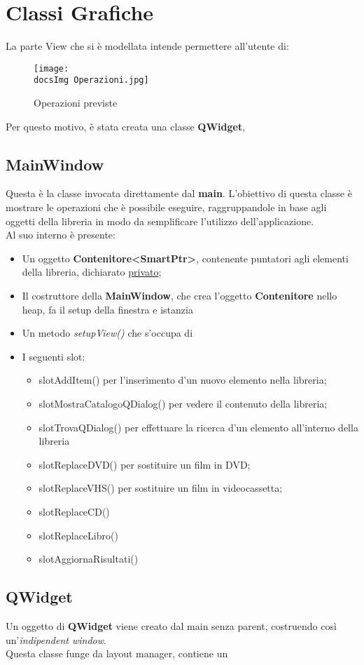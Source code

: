 \section{Classi Grafiche}{
	La parte View che si è modellata intende permettere all'utente di:

	\begin{figure}[h]
			\begin{center}
				\texttt{[image: \\docsImg Operazioni.jpg]}
				\caption{Operazioni previste}
			\end{center}
	\end{figure}
	
	Per questo motivo, è stata creata una classe \textbf{QWidget},
	\subsection{MainWindow}{
		Questa è la classe invocata direttamente dal \textbf{main}. L'obiettivo di questa classe è mostrare le operazioni che è possibile eseguire, raggruppandole in base agli oggetti della libreria in modo da semplificare l'utilizzo dell'applicazione.\\
		Al suo interno è presente:
		\begin{itemize}\itemsep=0.5pt
			\item Un oggetto \textbf{Contenitore<SmartPtr>}, contenente puntatori agli elementi della libreria, dichiarato \underline{privato};
			\item Il costruttore della \textbf{MainWindow}, che crea l'oggetto \textbf{Contenitore} nello heap, fa il setup della finestra e istanzia 
			\item Un metodo \textit{setupView()} che s'occupa di
			\item I seguenti slot:
			\begin{itemize}\itemsep=0.5pt
				\item slotAddItem() per l'inserimento d'un nuovo elemento nella libreria;
				\item slotMostraCatalogoQDialog()  per vedere il contenuto della libreria;
				\item slotTrovaQDialog() per effettuare la ricerca d'un elemento all'interno della libreria
			    \item slotReplaceDVD() per sostituire un film in DVD;
			    \item slotReplaceVHS() per sostituire un film in videocassetta;
			    \item slotReplaceCD()
			    \item slotReplaceLibro()
			    \item slotAggiornaRisultati() 
			\end{itemize}
		\end{itemize}
	}
	
	\subsection{QWidget}{
		Un oggetto di \textbf{QWidget} viene creato dal main senza parent, costruendo così un'\textit{indipendent window}. \\
		Questa classe funge da layout manager, contiene un 
	}
}